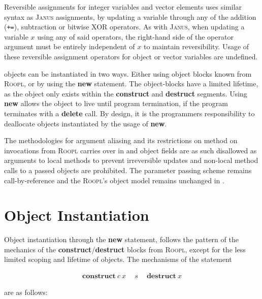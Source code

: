 Reversible assignments for integer variables and vector elements uses similar syntax as \textsc{Janus} assignments, by updating a variable through any of the addition (\texttt{+=}), subtraction or bitwise XOR operators. As with \textsc{Janus}, when updating a variable $x$ using any of said operators, the right-hand side of the operator argument must be entirely independent of $x$ to maintain reversibility. Usage of these reversible assignment operators for object or vector variables are undefined.

\rooplpp objects can be instantiated in two ways. Either using object blocks known from \textsc{Roopl}, or by using the \textbf{new} statement. The object-blocks have a limited lifetime, as the object only exists within the \textbf{construct} and \textbf{destruct} segments. Using \textbf{new} allows the object to live until program termination, if the program terminates with a \textbf{delete} call. By design, it is the programmers responsibility to deallocate objects instantiated by the usage of \textbf{new}.

The methodologies for argument aliasing and its restrictions on method on invocations from \textsc{Roopl} carries over in \rooplpp and object fields are as such disallowed as arguments to local methods to prevent irreversible updates and non-local method calls to a passed objects are prohibited. The parameter passing scheme remains call-by-reference and the \textsc{Roopl}'s object model remains unchanged in \rooplpp.

\section{Object Instantiation}
\label{sec:object-instantiation}
Object instantiation through the \textbf{new} statement, follows the pattern of the mechanics of the \textbf{construct}/\textbf{destruct} blocks from \textsc{Roopl}, except for the less limited scoping and lifetime of objects. The mechanisms of the statement 

\begin{align*}
\textbf{construct}\ c\ x\ \quad s\ \quad \textbf{destruct}\ x
\end{align*}

are as follows:

